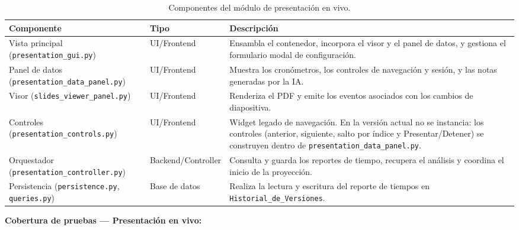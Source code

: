 \documentclass[11pt]{article}
\begin{document}
\begin{table}[H]
    \centering
    \begin{tabular}{|L{0.34\textwidth}|L{0.18\textwidth}|L{0.38\textwidth}|}
        \hline
        \textbf{Componente} & \textbf{Tipo} & \textbf{Descripción} \\ \hline
        Vista principal (\texttt{presentation\_gui.py}) & UI/Frontend & Ensambla el contenedor, incorpora el visor y el panel de datos, y gestiona el formulario modal de configuración. \\ \hline
        Panel de datos (\texttt{presentation\_data\_panel.py}) & UI/Frontend & Muestra los cronómetros, los controles de navegación y sesión, y las notas generadas por la IA. \\ \hline
        Visor (\texttt{slides\_viewer\_panel.py}) & UI/Frontend & Renderiza el PDF y emite los eventos asociados con los cambios de diapositiva. \\ \hline
        Controles (\texttt{presentation\_controls.py}) & UI/Frontend & Widget legado de navegación. En la versión actual no se instancia: los controles (anterior, siguiente, salto por índice y Presentar/Detener) se construyen dentro de \texttt{presentation\_data\_panel.py}. \\ \hline
        Orquestador (\texttt{presentation\_controller.py}) & Backend/Controller & Consulta y guarda los reportes de tiempo, recupera el análisis y coordina el inicio de la proyección. \\ \hline
        Persistencia (\texttt{persistence.py}, \texttt{queries.py}) & Base de datos & Realiza la lectura y escritura del reporte de tiempos en \texttt{Historial\_de\_Versiones}. \\ \hline
    \end{tabular}
    \caption{Componentes del módulo de presentación en vivo.}
    \label{tab:componentes-modulo-presentacion}
\end{table}

\clearpage
\textbf{Cobertura de pruebas --- Presentación en vivo:}
\end{document}
